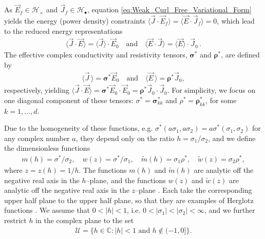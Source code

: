 \documentclass[english,12pt,jmp,graphicx]{revtex4-1}
\begin{document}
As $\vec{E}_f\in\mathscr{H}_\times$ and $\vec{J}_f\in\mathscr{H}_{\bullet}$, equation
\eqref{eq:Weak_Curl_Free_Variational_Form}
yields the energy (power density) constraints
$\langle\vec{J}\cdot\vec{E}_f\rangle=\langle\vec{E}\cdot\vec{J}_f\rangle=0$, which lead to the
reduced energy representations   
%
\begin{align}\label{eq:Reduced_System_Energy_Representations}
  \langle\vec{J}\cdot\vec{E}\rangle=\langle\vec{J}\rangle\cdot\vec{E}_0 \quad \text{and} \quad
  \langle\vec{E}\cdot\vec{J}\rangle=\langle\vec{E}\rangle\cdot\vec{J}_0\,.
\end{align}
%
The effective complex conductivity and resistivity tensors, $\bm{\sigma}^*$
and $\bm{\rho}^*$, are defined by  
%
\begin{align}\label{eq:eff_eps_def}
    \langle \vec{J} \,\rangle=  \bm{\sigma}^* \vec{E}_0 \quad \text{and} \quad
    \langle \vec{E} \,\rangle=  \bm{\rho}^*\vec{J}_0,
\end{align}
%
respectively, yielding
$\langle\vec{J}\cdot\vec{E}\rangle=\bm{\sigma}^*\vec{E}_0\cdot\vec{E}_0=\bm{\rho}^*\vec{J}_0\cdot\vec{J}_0$. For 
simplicity, we focus on one diagonal component of 
these
tensors: $\sigma^*=\bm{\sigma}^*_{kk}$ and
$\rho^*=\bm{\rho}^*_{kk}$, for some $k=1,\ldots,d$.

Due to the homogeneity of these functions, e.g.
$\sigma^*(a\sigma_1,a\sigma_2)=a\sigma^*(\sigma_1,\sigma_2)$ for any complex number $a$,
they depend only on the ratio $h=\sigma_1/\sigma_2$, and we define the
dimensionless functions
%
\begin{align}
  m(h)=\sigma^*/\sigma_2, \quad w(z)=\sigma^*/\sigma_1, \quad \tilde{m}(h)=\sigma_1\rho^*,
  \quad \tilde{w}(z)=\sigma_2\rho^*,
\end{align}
%
where $z=z(h)=1/h$. The functions $m(h)$ and $\tilde{m}(h)$ are
analytic off the 
negative real axis in the $h$--plane, and the functions $w(z)$ and
$\tilde{w}(z)$ are analytic off the negative real axis in the
$z$--plane \cite{Golden:CMP-473}. Each take the corresponding upper
half plane to the upper half plane, so that they are examples of 
Herglotz functions \cite{Golden:CMP-473}. We assume that $0<|h|<1$,
i.e. $0<|\sigma_1|<|\sigma_2|<\infty$, and we further restrict $h$ in the complex
plane to the set
%
\begin{align}\label{eq:h_Domain}
  \mathcal{U}=\{h\in\mathbb{C}: |h|<1 \text{ and } h\not\in(-1,0]\}.
\end{align}
%
\end{document}
